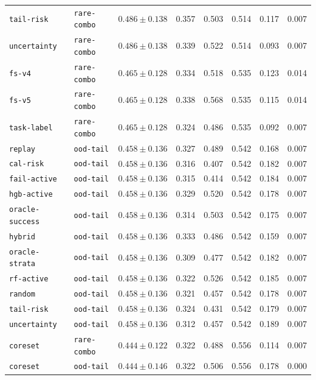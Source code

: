 \documentclass{article}
\begin{document}
\begin{center}
\begin{tabular}{llcccccc}
\texttt{tail-risk} & \texttt{rare-combo} & $0.486 \pm 0.138$ & 0.357 & 0.503 & 0.514 & 0.117 & 0.007 \\
\texttt{uncertainty} & \texttt{rare-combo} & $0.486 \pm 0.138$ & 0.339 & 0.522 & 0.514 & 0.093 & 0.007 \\
\texttt{fs-v4} & \texttt{rare-combo} & $0.465 \pm 0.128$ & 0.334 & 0.518 & 0.535 & 0.123 & 0.014 \\
\texttt{fs-v5} & \texttt{rare-combo} & $0.465 \pm 0.128$ & 0.338 & 0.568 & 0.535 & 0.115 & 0.014 \\
\texttt{task-label} & \texttt{rare-combo} & $0.465 \pm 0.128$ & 0.324 & 0.486 & 0.535 & 0.092 & 0.007 \\
\texttt{replay} & \texttt{ood-tail} & $0.458 \pm 0.136$ & 0.327 & 0.489 & 0.542 & 0.168 & 0.007 \\
\texttt{cal-risk} & \texttt{ood-tail} & $0.458 \pm 0.136$ & 0.316 & 0.407 & 0.542 & 0.182 & 0.007 \\
\texttt{fail-active} & \texttt{ood-tail} & $0.458 \pm 0.136$ & 0.315 & 0.414 & 0.542 & 0.184 & 0.007 \\
\texttt{hgb-active} & \texttt{ood-tail} & $0.458 \pm 0.136$ & 0.329 & 0.520 & 0.542 & 0.178 & 0.007 \\
\texttt{oracle-success} & \texttt{ood-tail} & $0.458 \pm 0.136$ & 0.314 & 0.503 & 0.542 & 0.175 & 0.007 \\
\texttt{hybrid} & \texttt{ood-tail} & $0.458 \pm 0.136$ & 0.333 & 0.486 & 0.542 & 0.159 & 0.007 \\
\texttt{oracle-strata} & \texttt{ood-tail} & $0.458 \pm 0.136$ & 0.309 & 0.477 & 0.542 & 0.182 & 0.007 \\
\texttt{rf-active} & \texttt{ood-tail} & $0.458 \pm 0.136$ & 0.322 & 0.526 & 0.542 & 0.185 & 0.007 \\
\texttt{random} & \texttt{ood-tail} & $0.458 \pm 0.136$ & 0.321 & 0.457 & 0.542 & 0.178 & 0.007 \\
\texttt{tail-risk} & \texttt{ood-tail} & $0.458 \pm 0.136$ & 0.324 & 0.431 & 0.542 & 0.179 & 0.007 \\
\texttt{uncertainty} & \texttt{ood-tail} & $0.458 \pm 0.136$ & 0.312 & 0.457 & 0.542 & 0.189 & 0.007 \\
\texttt{coreset} & \texttt{rare-combo} & $0.444 \pm 0.122$ & 0.322 & 0.488 & 0.556 & 0.114 & 0.007 \\
\texttt{coreset} & \texttt{ood-tail} & $0.444 \pm 0.146$ & 0.322 & 0.506 & 0.556 & 0.178 & 0.000 \\
\bottomrule
\end{tabular}
\end{center}
\end{document}
